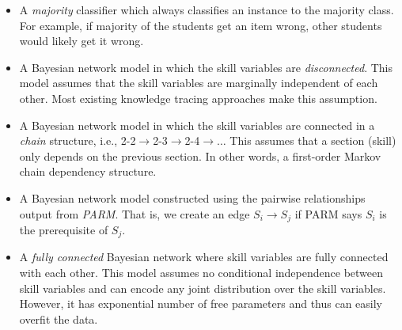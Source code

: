 \documentclass{edm_template}
\begin{document}
	\begin{itemize}[topsep=2pt,parsep=0pt,partopsep=0pt]
		\item  A \emph{majority} classifier which always classifies  an instance to the majority class.
		For example, if majority of the students get an item wrong, other students would likely get it wrong.
		\item  A Bayesian network model in which the skill variables are \emph{disconnected}. 
		This model assumes that the skill variables are marginally independent of each other. Most existing knowledge tracing approaches make this assumption.
		\item A Bayesian network model in which the skill variables are connected in a \emph{chain} structure, i.e., 2-2$\rightarrow$2-3$\rightarrow$2-4$\rightarrow\dots$
		This assumes that a section (skill) only depends on the previous section.
		In other words, a first-order Markov chain dependency structure.
		\item A Bayesian network model constructed using the pairwise relationships output from \emph{PARM}. 
		That is, we create an edge $S_i\rightarrow S_j$ if PARM says $S_i$ is the prerequisite of $S_j$.
		\item A \emph{fully connected} Bayesian network where skill variables are fully connected with each other.
		This model assumes no conditional independence between skill variables and can encode any joint distribution over the skill variables.
		However, it has exponential number of free parameters and thus can easily overfit the data.
	\end{itemize}
\end{document}
